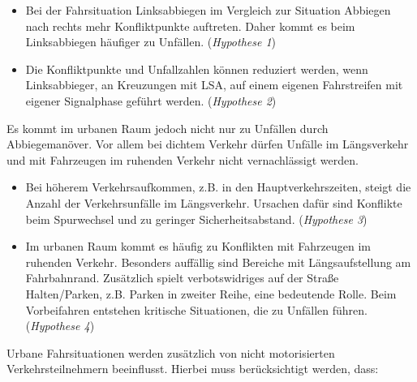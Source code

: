 \begin{itemize}
	\item Bei der Fahrsituation Linksabbiegen im Vergleich zur Situation Abbiegen nach rechts mehr Konfliktpunkte auftreten. Daher kommt es beim Linksabbiegen häufiger zu Unfällen. (\textit{Hypothese 1})
	\item Die Konfliktpunkte und Unfallzahlen können reduziert werden, wenn Linksabbieger, an Kreuzungen mit LSA, auf einem eigenen Fahrstreifen mit eigener Signalphase geführt werden. (\textit{Hypothese 2})
\end{itemize}

Es kommt im urbanen Raum jedoch nicht nur zu Unfällen durch Abbiegemanöver. Vor allem bei dichtem Verkehr dürfen Unfälle im Längsverkehr und mit Fahrzeugen im ruhenden Verkehr nicht vernachlässigt werden. 

\begin{itemize}	
	\item Bei höherem Verkehrsaufkommen, z.B. in den Hauptverkehrszeiten, steigt die Anzahl der Verkehrsunfälle im Längsverkehr. Ursachen dafür sind Konflikte beim Spurwechsel und zu geringer Sicherheitsabstand. (\textit{Hypothese 3})
	\item Im urbanen Raum kommt es häufig zu Konflikten mit Fahrzeugen im ruhenden Verkehr. Besonders auffällig sind Bereiche mit Längsaufstellung am Fahrbahnrand. Zusätzlich spielt verbotswidriges auf der Straße Halten/Parken, z.B. Parken in zweiter Reihe, eine bedeutende Rolle. Beim Vorbeifahren entstehen kritische Situationen, die zu Unfällen führen. (\textit{Hypothese 4})
\end{itemize}

Urbane Fahrsituationen werden zusätzlich von nicht motorisierten Verkehrsteilnehmern beeinflusst. Hierbei muss berücksichtigt werden, dass:
	
